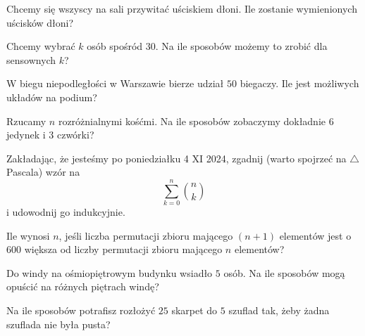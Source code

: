 \documentclass{../uoom}
\begin{document}
\begin{zadanie}
  Chcemy się wszyscy na sali przywitać uściskiem dłoni. Ile zostanie wymienionych uścisków dłoni?
\end{zadanie}

\begin{zadanie}
  Chcemy wybrać $k$ osób spośród $30$. Na ile sposobów możemy to zrobić dla sensownych $k$?
\end{zadanie}

\begin{zadanie}
  W biegu niepodległości w Warszawie bierze udział $50$ biegaczy. Ile jest możliwych układów na podium?
\end{zadanie}

\begin{zadanie}
  Rzucamy $n$ rozróżnialnymi kośćmi. Na ile sposobów zobaczymy dokładnie $6$ jedynek i $3$ czwórki?
\end{zadanie}

\begin{zadanie}
  Zakładając, że jesteśmy po poniedziałku 4 XI 2024, zgadnij (warto spojrzeć na $\triangle$ Pascala) wzór na
  $$\sum_{k=0}^n\binom{n}{k}$$
  i udowodnij go indukcyjnie.
\end{zadanie}



\begin{zadanie}
  Ile wynosi $n$, jeśli liczba permutacji zbioru mającego $(n+1)$ elementów jest o $600$ większa od liczby permutacji zbioru mającego $n$ elementów?
\end{zadanie}

\begin{zadanie}
Do windy na ośmiopiętrowym budynku wsiadło $5$ osób. Na ile sposobów mogą opuścić na różnych piętrach windę?
\end{zadanie}

\begin{zadanie}
  Na ile sposobów potrafisz rozłożyć $25$ skarpet do $5$ szuflad tak, żeby żadna szuflada nie była pusta?
\end{zadanie}
\end{document}
